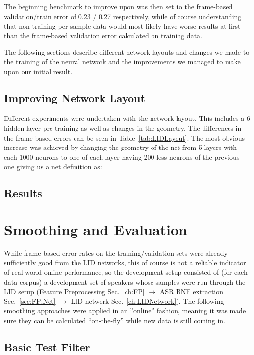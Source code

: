 The beginning benchmark to improve upon was then set to the frame-based validation/train error of 0.23 / 0.27 respectively, while of course understanding that non-training per-sample data would most likely have worse results at first than the frame-based validation error calculated on training data.

The following sections describe different network layouts and changes we made to the training of the neural network and the improvements we managed to make upon our initial result.

\section{Improving Network Layout}
\label{sec:LIDNetwork:Layout}

Different experiments were undertaken with the network layout. This includes a 6 hidden layer pre-training as well as changes in the geometry. The differences in the frame-based errors can be seen in Table~\ref{tab:LIDLayout}. The most obvious increase was achieved by changing the geometry of the net from 5 layers with each 1000 neurons to one of each layer having 200 less neurons of the previous one giving us a net definition as:

\section{Results}
\label{sec:LIDNetwork:Results}


\chapter{Smoothing and Evaluation}
\label{ch:eval}

While frame-based error rates on the training/validation sets were already sufficiently good from the LID networks, this of course is not a reliable indicator of real-world online performance, so the development setup consisted of (for each data corpus) a development set of speakers whose samples were run through the LID setup (Feature Preprocessing Sec.~\ref{ch:FP} $\rightarrow$ ASR BNF extraction Sec.~\ref{sec:FP:Net} $\rightarrow$ LID network Sec.~\ref{ch:LIDNetwork}). The following smoothing approaches were applied in an ''online'' fashion, meaning it was made sure they can be calculated ``on-the-fly'' while new data is still coming in.

\section{Basic Test Filter}
\label{sec:eval:basic}

